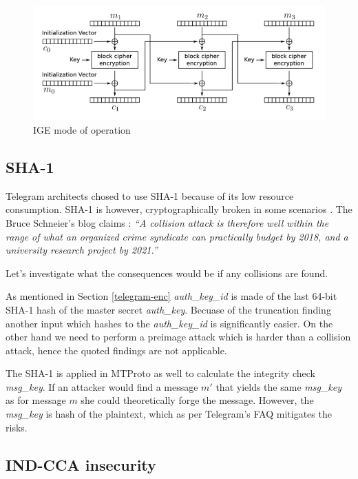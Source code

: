 \documentclass[thesis=M,english]{FITthesis}[2012/10/20]
\begin{document}
\begin{figure}[htb]
	\centering
	\includegraphics[width=1\textwidth]{telegram-ige-enc.png}
	\caption{IGE mode of operation \cite{telegram-aarhus}}
	\label{img:telegram-ige-enc}
\end{figure}


\subsection{SHA-1}

Telegram architects chosed to use SHA-1 because of its low resource consumption. SHA-1 is however, cryptographically broken in some scenarios \cite{telegram-sha1}. The Bruce Schneier's blog claims \cite{telegram-sha1}: \emph{``A collision attack is therefore well within the range of what an organized crime syndicate can practically budget by 2018, and a university research project by 2021.''}

Let's investigate what the consequences would be if any collisions are found.

As mentioned in Section \ref{telegram-enc} \emph{auth\_key\_id} is made of the last 64-bit SHA-1 hash of the master secret \emph{auth\_key}. Becuase of the truncation finding another input which hashes to the \emph{auth\_key\_id} is significantly easier. On the other hand we need to perform a preimage attack which is harder than a collision attack, hence the quoted findings are not applicable.

The SHA-1 is applied in MTProto as well to calculate the integrity check \emph{msg\_key}. If an attacker would find a message $m'$ that yields the same \emph{msg\_key} as for message $m$ she could theoretically forge the message. However, the \emph{msg\_key} is hash of the plaintext, which as per Telegram's FAQ \cite{telegram-techfaq} mitigates the risks.

\subsection{IND-CCA insecurity}
\end{document}
